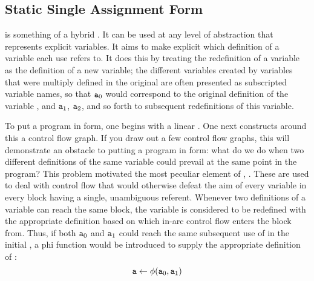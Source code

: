 \subsection{Static Single Assignment Form}
 is something of a hybrid \IR. It can be used at any level of abstraction that represents explicit variables. It aims to make explicit which definition of a variable each use refers to. It does this by treating the redefinition of a variable as the definition of a new variable; the different variables created by variables that were multiply defined in the original \IR are often presented as subscripted variable names, so that $\texttt{a}_{0}$ would correspond to the original definition of the variable , and $\texttt{a}_{1}$, $\texttt{a}_{2}$, and so forth to subsequent redefinitions of this variable.

To put a program in \SSA form, one begins with a linear \IR. One next constructs around this a control flow graph. If you draw out a few control flow graphs, this will demonstrate an obstacle to putting a program in \SSA[long] form: what do we do when two different definitions of the same variable could prevail at the same point in the program? This problem motivated the most peculiar element of \SSA, . These are used to deal with control flow that would otherwise defeat the aim of every variable in every block having a single, unambiguous referent. Whenever two definitions of a variable can reach the same block, the variable is considered to be redefined with the appropriate definition based on which in-arc control flow enters the block from. Thus, if both $\texttt{a}_{0}$ and $\texttt{a}_{1}$ could reach the same subsequent use of  in the initial \IR, a phi function would be introduced to supply the appropriate definition of :
\[
\texttt{a} \gets \phi(\texttt{a}_{0}, \texttt{a}_{1})
\]
 

